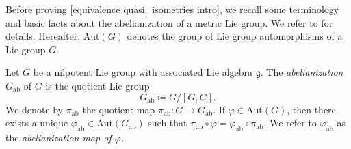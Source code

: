 \documentclass[a4paper,11pt,reqno]{amsart}
\theoremstyle{plain}
\theoremstyle{definition}
\newcommand{\g}{\mathfrak{g}}
\newcommand{\vphi}{\varphi}
\newcommand{\coloneq}{\coloneqq}
\begin{document}

Before proving \cref{equivalence quasi_isometries intro}, we recall some terminology and basic facts about the abelianization of a metric Lie group. We refer to \cite[Section~10.1]{donne2024metricliegroupscarnotcaratheodory} for details. Hereafter, $\mathrm{Aut}(G)$ denotes the group of Lie group automorphisms of a Lie group $G$.

Let $G$ be a nilpotent Lie group with associated Lie algebra $\g$. The \emph{abelianization} $G_\mathrm{ab}$ of $G$ is the quotient Lie group 
\begin{equation*}
 G_\mathrm{ab} \coloneq G/[G,G].
\end{equation*}
We denote by $\pi_\mathrm{ab}$ the quotient map $\pi_\mathrm{ab} \colon G \to G_\mathrm{ab}$. If $\vphi \in \mathrm{Aut}(G)$, then there exists a unique $\vphi_\mathrm{ab} \in \mathrm{Aut}(G_\mathrm{ab})$ such that $\pi_\mathrm{ab} \circ \vphi = \vphi_\mathrm{ab} \circ \pi_\mathrm{ab}$. We refer to $\vphi_\mathrm{ab}$ as the \emph{abelianization map of $\vphi$.}
\end{document}
